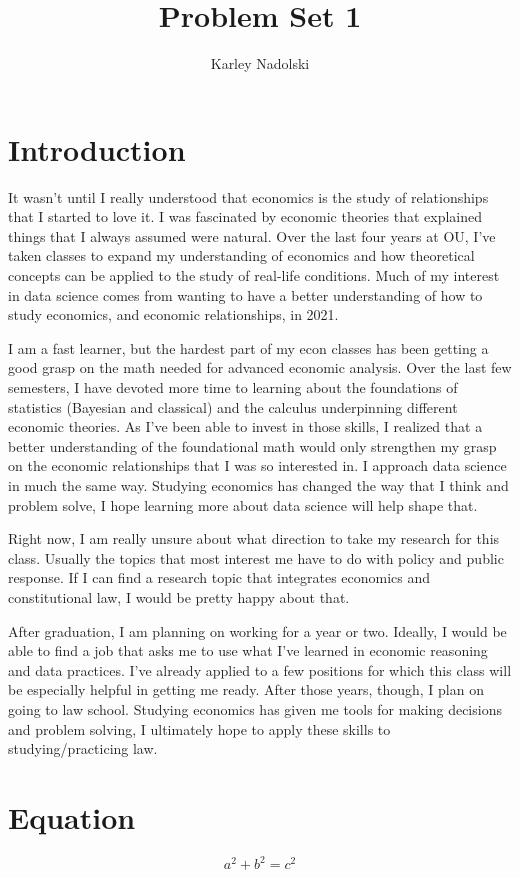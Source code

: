 \documentclass{homeworg}
\title{Problem Set 1}
\author{Karley Nadolski}
\begin{document}
\maketitle

\section{Introduction}
It wasn't until I really understood that economics is the study of relationships that I started to love it. I was fascinated by economic theories that explained things that I always assumed were natural. Over the last four years at OU, I've taken classes to expand my understanding of economics and how theoretical concepts can be applied to the study of real-life conditions. Much of my interest in data science comes from wanting to have a better understanding of how to study economics, and economic relationships, in 2021. 

I am a fast learner, but the hardest part of my econ classes has been getting a good grasp on the math needed for advanced economic analysis. Over the last few semesters, I have devoted more time to learning about the foundations of statistics (Bayesian and classical) and the calculus underpinning different economic theories. As I've been able to invest in those skills, I realized that a better understanding of the foundational math would only strengthen my grasp on the economic relationships that I was so interested in. I approach data science in much the same way. Studying economics has changed the way that I think and problem solve, I hope learning more about data science will help shape that. 

Right now, I am really unsure about what direction to take my research for this class. Usually the topics that most interest me have to do with policy and public response. If I can find a research topic that integrates economics and constitutional law, I would be pretty happy about that. 

After graduation, I am planning on working for a year or two. Ideally, I would be able to find a job that asks me to use what I've learned in economic reasoning and data practices. I've already applied to a few positions for which this class will be especially helpful in getting me ready. After those years, though, I plan on going to law school. Studying economics has given me tools for making decisions and problem solving, I ultimately hope to apply these skills to studying/practicing law. 

\section{Equation}

\[ a^2 + b^2 = c^2\]
\end{document}
